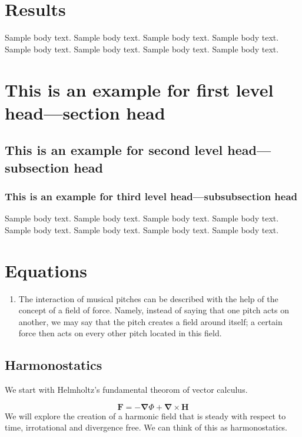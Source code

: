 \documentclass[sn-mathphys]{sn-jnl}%
\begin{document}
\section{Results}\label{sec2}

Sample body text. Sample body text. Sample body text. Sample body text. Sample body text. Sample body text. Sample body text. Sample body text.

\section{This is an example for first level head---section head}\label{sec3}

\subsection{This is an example for second level head---subsection head}\label{subsec2}

\subsubsection{This is an example for third level head---subsubsection head}\label{subsubsec2}

Sample body text. Sample body text. Sample body text. Sample body text. Sample body text. Sample body text. Sample body text. Sample body text. 

\section{Equations}\label{sec4}

\begin{enumerate}
\item The interaction of musical pitches can be described with the help of the concept of a field of force. Namely, instead of saying that one pitch acts on another, we may say that the pitch creates a field around itself; a certain force then acts on every other pitch located in this field.
\end{enumerate}

\subsection{Harmonostatics}

We start with Helmholtz's fundamental theorom of vector calculus.

\begin{equation}
  \boldsymbol{F} = -\boldsymbol{\nabla}\Phi + \boldsymbol{\nabla}\times\boldsymbol{H} \label{helmholtzEq}
\end{equation}
We will explore the creation of a harmonic field that is steady with respect to time, irrotational and divergence free. We can think of this as harmonostatics. 
\end{document}
